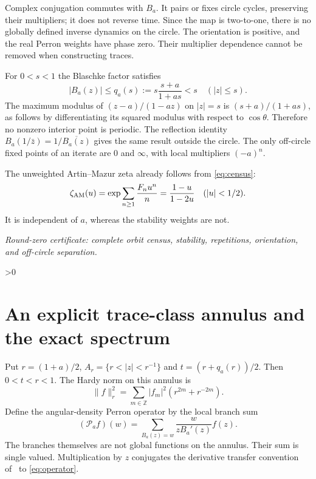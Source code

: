 \documentclass[10pt]{article}
\newcommand{\PP}{\mathcal P}
\begin{document}
Complex conjugation commutes with $B_a$. It pairs or fixes circle cycles,
preserving their multipliers; it does not reverse time. Since the map is
two-to-one, there is no globally defined inverse dynamics on the circle.
The orientation is positive, and the real Perron weights have phase zero.
Their multiplier dependence cannot be removed when constructing traces.

For $0<s<1$ the Blaschke factor satisfies
\begin{equation}
 |B_a(z)|\leq q_a(s):=s\frac{s+a}{1+as}<s\quad (|z|\leq s).
 \label{eq:disk}
\end{equation}
The maximum modulus of $(z-a)/(1-az)$ on $|z|=s$ is
$(s+a)/(1+as)$, as follows by differentiating its squared modulus with
respect to $\cos\theta$. Therefore no nonzero interior point is periodic.
The reflection identity $B_a(1/\bar z)=1/\overline{B_a(z)}$ gives the
same result outside the circle. The only off-circle fixed points of an
iterate are $0$ and $\infty$, with local multipliers $(-a)^n$.

The unweighted Artin--Mazur zeta already follows from \eqref{eq:census}:
\begin{equation}
 \zeta_{\rm AM}(u)=\exp\sum_{n\geq1}\frac{F_nu^n}{n}
 =\frac{1-u}{1-2u}\quad(|u|<1/2). \label{eq:AM}
\end{equation}
It is independent of $a$, whereas the stability weights are not.
\par\noindent\emph{Round-zero certificate: complete orbit census, stability,
repetitions, orientation, and off-circle separation.}

\ifnum\CRevisionRound>0
\section{An explicit trace-class annulus and the exact spectrum}

Put $r=(1+a)/2$, $A_r=\{r<|z|<r^{-1}\}$ and
$t=(r+q_a(r))/2$. Then $0<t<r<1$.
The Hardy norm on this annulus is
\[
 \|f\|_r^2=\sum_{m\in\mathbb Z}|f_m|^2(r^{2m}+r^{-2m}).
\]
Define the angular-density Perron operator by the local branch sum
\begin{equation}
 (\PP_a f)(w)=\sum_{B_a(z)=w}\frac{w}{zB_a'(z)}f(z).
 \label{eq:operator}
\end{equation}
The branches themselves are not global functions on the annulus. Their
sum is single valued. Multiplication by $z$ conjugates the derivative
transfer convention of~\cite{BJS} to \eqref{eq:operator}.
\end{document}
